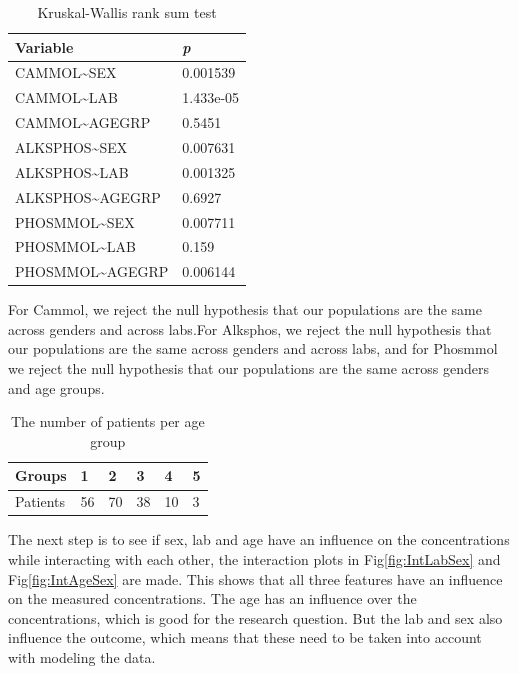 \documentclass{article}
\begin{document}
    \begin{table}[H]
    \begin{center}
    \begin{tabular}{|ll|}
        \hline
        Variable & \textit{p} \\
        \hline 
        \hline
        CAMMOL\textasciitilde SEX & 0.001539 \\
        CAMMOL\textasciitilde LAB & 1.433e-05 \\
        CAMMOL\textasciitilde AGEGRP & 0.5451 \\
        \hline
        \hline 
        ALKSPHOS\textasciitilde SEX & 0.007631 \\
        ALKSPHOS\textasciitilde LAB & 0.001325 \\
        ALKSPHOS\textasciitilde AGEGRP & 0.6927 \\
        \hline
        \hline 
        PHOSMMOL\textasciitilde SEX & 0.007711 \\
        PHOSMMOL\textasciitilde LAB & 0.159 \\
        PHOSMMOL\textasciitilde AGEGRP & 0.006144 \\
        \hline
    \end{tabular}
    \caption{Kruskal-Wallis rank sum test}
    \label{table:krusk}
    \end{center}
    \end{table}
    
  For Cammol, we reject the null hypothesis that our populations are the same across genders and across labs.For Alksphos, we reject the null hypothesis that our populations are the same across genders and across labs, and for Phosmmol we reject the null hypothesis that our populations are the same across genders and age groups.
      
      \begin{table}[H]
        \begin{center}
          \begin{tabular}{|l|lllll|}
          \hline
          Groups&1&2&3&4&5\\
          \hline
          Patients&56&70&38&10&3\\
          \hline
          \end{tabular}
        \end{center}
        \caption{The number of patients per age group}
        \label{table:Agegrp}
      \end{table}

      The next step is to see if sex, lab and age have an influence on the concentrations while interacting with each other, the interaction plots in Fig\ref{fig:IntLabSex} and Fig\ref{fig:IntAgeSex} are made.
      This shows that all three features have an influence on the measured concentrations.
      The age has an influence over the concentrations, which is good for the research question. 
      But the lab and sex also influence the outcome, which means that these need to be taken into account with modeling the data.
\end{document}
